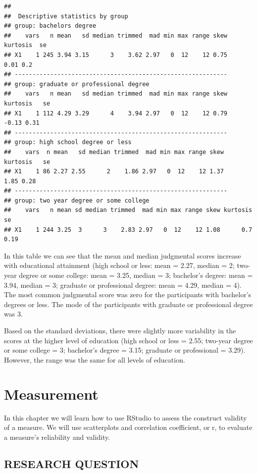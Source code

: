\documentclass[
]{book}
\begin{document}
\begin{verbatim}
## 
##  Descriptive statistics by group 
## group: bachelors degree
##    vars   n mean   sd median trimmed  mad min max range skew kurtosis  se
## X1    1 245 3.94 3.15      3    3.62 2.97   0  12    12 0.75     0.01 0.2
## ------------------------------------------------------------ 
## group: graduate or professional degree
##    vars   n mean   sd median trimmed  mad min max range skew kurtosis   se
## X1    1 112 4.29 3.29      4    3.94 2.97   0  12    12 0.79    -0.13 0.31
## ------------------------------------------------------------ 
## group: high school degree or less
##    vars  n mean   sd median trimmed  mad min max range skew kurtosis   se
## X1    1 86 2.27 2.55      2    1.86 2.97   0  12    12 1.37     1.85 0.28
## ------------------------------------------------------------ 
## group: two year degree or some college
##    vars   n mean sd median trimmed  mad min max range skew kurtosis   se
## X1    1 244 3.25  3      3    2.83 2.97   0  12    12 1.08      0.7 0.19
\end{verbatim}

In this table we can see that the mean and median judgmental scores increase with educational attainment (high school or less: mean = 2.27, median = 2; two-year degree or some college: mean = 3.25, median = 3; bachelor's degree: mean = 3.94, median = 3; graduate or professional degree: mean = 4.29, median = 4). The most common judgmental score was zero for the participants with bachelor's degrees or less. The mode of the participants with graduate or professional degree was 3.

Based on the standard deviations, there were slightly more variability in the scores at the higher level of education (high school or less = 2.55; two-year degree or some college = 3; bachelor's degree = 3.15; graduate or professional = 3.29). However, the range was the same for all levels of education.

\hypertarget{measurement}{%
\chapter{Measurement}\label{measurement}}

In this chapter we will learn how to use RStudio to assess the construct validity of a measure. We will use scatterplots and correlation coefficient, or r, to evaluate a measure's reliability and validity.

\hypertarget{research-question-2}{%
\section{RESEARCH QUESTION}\label{research-question-2}}
\end{document}
